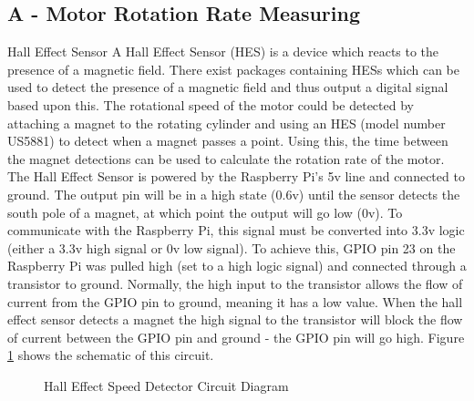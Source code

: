 \documentclass[twoside,a4]{report}
\def\br{\newline \newline \noindent}
\begin{document}
\subsection*{A - Motor Rotation Rate Measuring}
\large Hall Effect Sensor \normalsize \br
A Hall Effect Sensor (HES) is a device which reacts to the presence of a magnetic field. There exist packages containing HESs which can be used to detect the presence of a magnetic field and thus output a digital signal based upon this. The rotational speed of the motor could be detected by attaching a magnet to the rotating cylinder and using an HES (model number US5881) to detect when a magnet passes a point. Using this, the time between the magnet detections can be used to calculate the rotation rate of the motor. \br
The Hall Effect Sensor is powered by the Raspberry Pi's 5v line and connected to ground. The output pin will be in a high state (0.6v) until the sensor detects the south pole of a magnet, at which point the output will go low (0v). To communicate with the Raspberry Pi, this signal must be converted into 3.3v logic (either a 3.3v high signal or 0v low signal). To achieve this, GPIO pin 23 on the Raspberry Pi was pulled high (set to a high logic signal) and connected through a transistor to ground. Normally, the high input to the transistor allows the flow of current from the GPIO pin to ground, meaning it has a low value. When the hall effect sensor detects a magnet the high signal to the transistor will block the flow of current between the GPIO pin and ground - the GPIO pin will go high. Figure \ref{circhall} shows the schematic of this circuit. \newline
\begin{figure}[!htb]
	\centering
	\caption{Hall Effect Speed Detector Circuit Diagram}
	\label{circhall}
\end{figure} \newline  \noindent
\end{document}
